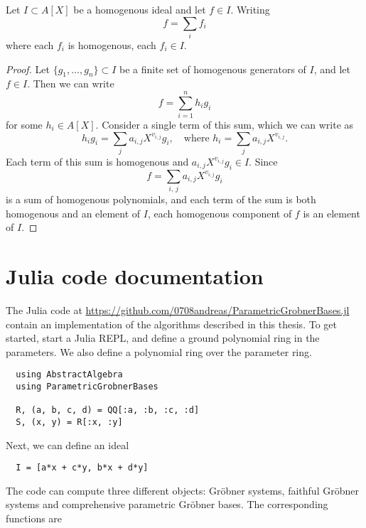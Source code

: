 \begin{lemma}\label{lem:homo_components}
  Let $I \subset A[X]$ be a homogenous ideal and let $f \in I$. Writing
  \[f = \sum_{i} f_{i}\]
  where each $f_{i}$ is homogenous, each $f_{i} \in I$.
\end{lemma}
\begin{proof}
  Let $\{g_{1}, \dots, g_{n}\} \subset I$ be a finite set of homogenous generators of $I$, and let $f \in I$. Then we can write
  \[f = \sum_{i=1}^{n} h_{i} g_{i}\]
  for some $h_{i} \in A[X]$. Consider a single term of this sum, which we can write as
  \[h_{i} g_{i} = \sum_{j} a_{i, j}X^{v_{i,j}} g_{i}, \quad \text{where } h_{i} = \sum_{j} a_{i, j}X^{v_{i,j}}.\]
  Each term of this sum is homogenous and $a_{i,j} X^{v_{i,j}} g_{i} \in I$. Since
  \[f = \sum_{i,\,j} a_{i,j} X^{v_{i, j}} g_{i}\]
  is a sum of homogenous polynomials, and each term of the sum is both homogenous and an element of $I$, each homogenous component of $f$ is an element of $I$.
\end{proof}





\section{Julia code documentation}
The Julia code at \url{https://github.com/0708andreas/ParametricGrobnerBases.jl} contain an implementation of the algorithms described in this thesis. To get started, start a Julia REPL, and define a ground polynomial ring in the parameters. We also define a polynomial ring over the parameter ring.

\begin{verbatim}
  using AbstractAlgebra
  using ParametricGrobnerBases

  R, (a, b, c, d) = QQ[:a, :b, :c, :d]
  S, (x, y) = R[:x, :y]
\end{verbatim}

Next, we can define an ideal

\begin{verbatim}
  I = [a*x + c*y, b*x + d*y]
\end{verbatim}

The code can compute three different objects: Gröbner systems, faithful Gröbner systems and comprehensive parametric Gröbner bases. The corresponding functions are

